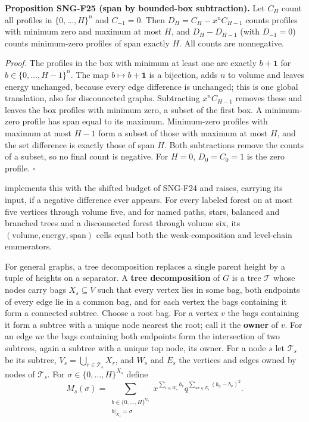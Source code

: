 \documentclass[
  11pt,
  a4paper,
]{report}
\let\singularitytexttt\texttt
\renewcommand{\texttt}[1]{\singularitytexttt{\seqsplit{#1}}}
\begin{document}
\textbf{Proposition SNG-F25 (span by bounded-box subtraction).} Let
\(C_H\) count all profiles in \(\{0,\ldots,H\}^n\) and \(C_{-1}=0\).
Then \(D_H=C_H-x^nC_{H-1}\) counts profiles with minimum zero and
maximum at most \(H\), and \(D_H-D_{H-1}\) (with \(D_{-1}=0\)) counts
minimum-zero profiles of span exactly \(H\). All counts are nonnegative.

\emph{Proof.} The profiles in the box with minimum at least one are
exactly \(b+\mathbf1\) for \(b\in\{0,\ldots,H-1\}^n\). The map
\(b\mapsto b+\mathbf1\) is a bijection, adds \(n\) to volume and leaves
energy unchanged, because every edge difference is unchanged; this is
one global translation, also for disconnected graphs. Subtracting
\(x^nC_{H-1}\) removes these and leaves the box profiles with minimum
zero, a subset of the first box. A minimum-zero profile has span equal
to its maximum. Minimum-zero profiles with maximum at most \(H-1\) form
a subset of those with maximum at most \(H\), and the set difference is
exactly those of span \(H\). Both subtractions remove the counts of a
subset, so no final count is negative. For \(H=0\), \(D_0=C_0=1\) is the
zero profile. \(\square\)

\texttt{marked\_forest\_coefficients} implements this with the shifted
budget of SNG-F24 and raises, carrying its input, if a negative
difference ever appears. For every labeled forest on at most five
vertices through volume five, and for named paths, stars, balanced and
branched trees and a disconnected forest through volume six, its
\((\text{volume},\text{energy},\text{span})\) cells equal both the
weak-composition and level-chain enumerators.

For general graphs, a tree decomposition replaces a single parent height
by a tuple of heights on a separator. A \textbf{tree decomposition} of
\(G\) is a tree \(\mathcal T\) whose nodes carry bags \(X_s\subseteq V\)
such that every vertex lies in some bag, both endpoints of every edge
lie in a common bag, and for each vertex the bags containing it form a
connected subtree. Choose a root bag. For a vertex \(v\) the bags
containing it form a subtree with a unique node nearest the root; call
it the \textbf{owner} of \(v\). For an edge \(uv\) the bags containing
both endpoints form the intersection of two subtrees, again a subtree
with a unique top node, its owner. For a node \(s\) let \(\mathcal T_s\)
be its subtree, \(V_s=\bigcup_{r\in\mathcal T_s}X_r\), and \(W_s\) and
\(E_s\) the vertices and edges owned by nodes of \(\mathcal T_s\). For
\(\sigma\in\{0,\ldots,H\}^{X_s}\) define \[
M_s(\sigma)=\sum_{\substack{b\in\{0,\ldots,H\}^{V_s}\\ b|_{X_s}=\sigma}}x^{\sum_{v\in W_s}b_v}q^{\sum_{uv\in E_s}(b_u-b_v)^2}.
\]
\end{document}
